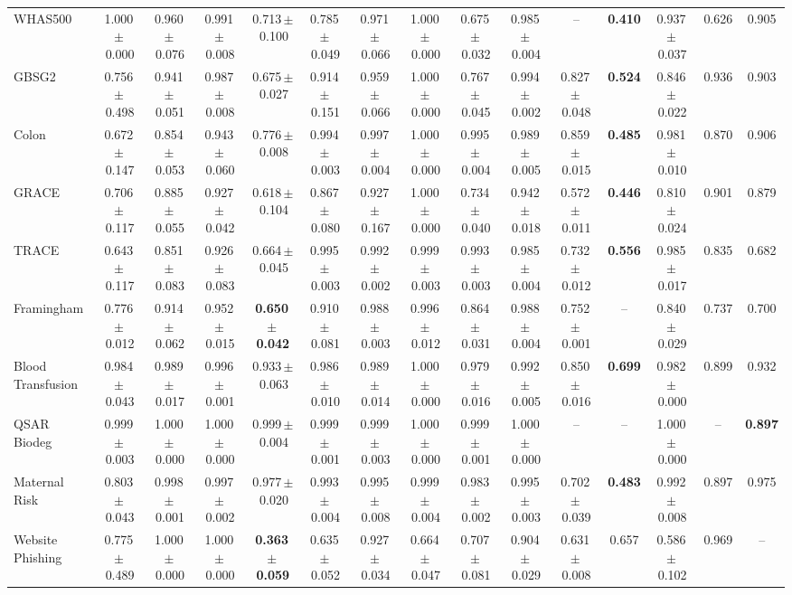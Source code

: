 \documentclass[8pt]{extarticle}
\begin{document}
\begin{longtable}{l*{14}{c}}
WHAS500 & 1.000\,$\pm$\,0.000 & 0.960\,$\pm$\,0.076 & 0.991\,$\pm$\,0.008 & 0.713\,$\pm$\,0.100 & 0.785\,$\pm$\,0.049 & 0.971\,$\pm$\,0.066 & 1.000\,$\pm$\,0.000 & 0.675\,$\pm$\,0.032 & 0.985\,$\pm$\,0.004 & -- & \textbf{0.410} & 0.937\,$\pm$\,0.037 & 0.626 & 0.905 \\
GBSG2 & 0.756\,$\pm$\,0.498 & 0.941\,$\pm$\,0.051 & 0.987\,$\pm$\,0.008 & 0.675\,$\pm$\,0.027 & 0.914\,$\pm$\,0.151 & 0.959\,$\pm$\,0.066 & 1.000\,$\pm$\,0.000 & 0.767\,$\pm$\,0.045 & 0.994\,$\pm$\,0.002 & 0.827\,$\pm$\,0.048 & \textbf{0.524} & 0.846\,$\pm$\,0.022 & 0.936 & 0.903 \\
Colon & 0.672\,$\pm$\,0.147 & 0.854\,$\pm$\,0.053 & 0.943\,$\pm$\,0.060 & 0.776\,$\pm$\,0.008 & 0.994\,$\pm$\,0.003 & 0.997\,$\pm$\,0.004 & 1.000\,$\pm$\,0.000 & 0.995\,$\pm$\,0.004 & 0.989\,$\pm$\,0.005 & 0.859\,$\pm$\,0.015 & \textbf{0.485} & 0.981\,$\pm$\,0.010 & 0.870 & 0.906 \\
GRACE & 0.706\,$\pm$\,0.117 & 0.885\,$\pm$\,0.055 & 0.927\,$\pm$\,0.042 & 0.618\,$\pm$\,0.104 & 0.867\,$\pm$\,0.080 & 0.927\,$\pm$\,0.167 & 1.000\,$\pm$\,0.000 & 0.734\,$\pm$\,0.040 & 0.942\,$\pm$\,0.018 & 0.572\,$\pm$\,0.011 & \textbf{0.446} & 0.810\,$\pm$\,0.024 & 0.901 & 0.879 \\
TRACE & 0.643\,$\pm$\,0.117 & 0.851\,$\pm$\,0.083 & 0.926\,$\pm$\,0.083 & 0.664\,$\pm$\,0.045 & 0.995\,$\pm$\,0.003 & 0.992\,$\pm$\,0.002 & 0.999\,$\pm$\,0.003 & 0.993\,$\pm$\,0.003 & 0.985\,$\pm$\,0.004 & 0.732\,$\pm$\,0.012 & \textbf{0.556} & 0.985\,$\pm$\,0.017 & 0.835 & 0.682 \\
Framingham & 0.776\,$\pm$\,0.012 & 0.914\,$\pm$\,0.062 & 0.952\,$\pm$\,0.015 & \textbf{0.650\,$\pm$\,0.042} & 0.910\,$\pm$\,0.081 & 0.988\,$\pm$\,0.003 & 0.996\,$\pm$\,0.012 & 0.864\,$\pm$\,0.031 & 0.988\,$\pm$\,0.004 & 0.752\,$\pm$\,0.001 & -- & 0.840\,$\pm$\,0.029 & 0.737 & 0.700 \\
Blood Transfusion & 0.984\,$\pm$\,0.043 & 0.989\,$\pm$\,0.017 & 0.996\,$\pm$\,0.001 & 0.933\,$\pm$\,0.063 & 0.986\,$\pm$\,0.010 & 0.989\,$\pm$\,0.014 & 1.000\,$\pm$\,0.000 & 0.979\,$\pm$\,0.016 & 0.992\,$\pm$\,0.005 & 0.850\,$\pm$\,0.016 & \textbf{0.699} & 0.982\,$\pm$\,0.000 & 0.899 & 0.932 \\
QSAR Biodeg & 0.999\,$\pm$\,0.003 & 1.000\,$\pm$\,0.000 & 1.000\,$\pm$\,0.000 & 0.999\,$\pm$\,0.004 & 0.999\,$\pm$\,0.001 & 0.999\,$\pm$\,0.003 & 1.000\,$\pm$\,0.000 & 0.999\,$\pm$\,0.001 & 1.000\,$\pm$\,0.000 & -- & -- & 1.000\,$\pm$\,0.000 & -- & \textbf{0.897} \\
Maternal Risk & 0.803\,$\pm$\,0.043 & 0.998\,$\pm$\,0.001 & 0.997\,$\pm$\,0.002 & 0.977\,$\pm$\,0.020 & 0.993\,$\pm$\,0.004 & 0.995\,$\pm$\,0.008 & 0.999\,$\pm$\,0.004 & 0.983\,$\pm$\,0.002 & 0.995\,$\pm$\,0.003 & 0.702\,$\pm$\,0.039 & \textbf{0.483} & 0.992\,$\pm$\,0.008 & 0.897 & 0.975 \\
Website Phishing & 0.775\,$\pm$\,0.489 & 1.000\,$\pm$\,0.000 & 1.000\,$\pm$\,0.000 & \textbf{0.363\,$\pm$\,0.059} & 0.635\,$\pm$\,0.052 & 0.927\,$\pm$\,0.034 & 0.664\,$\pm$\,0.047 & 0.707\,$\pm$\,0.081 & 0.904\,$\pm$\,0.029 & 0.631\,$\pm$\,0.008 & 0.657 & 0.586\,$\pm$\,0.102 & 0.969 & -- \\
\end{longtable}
\end{document}
